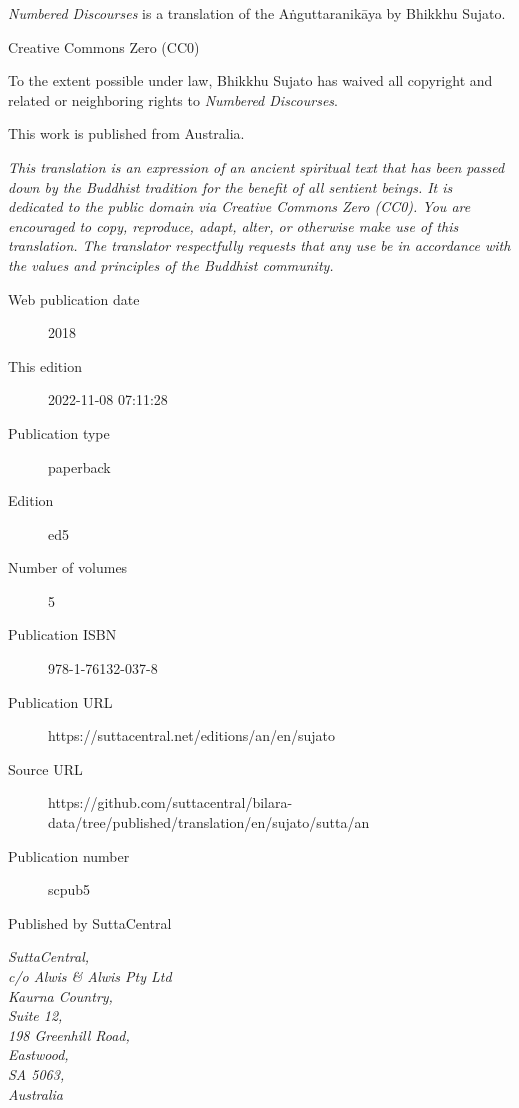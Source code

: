 \documentclass[12pt,openany]{book}%
\begin{document}
\begin{footnotesize}

\textit{Numbered Discourses} is a translation of the Aṅguttaranikāya by Bhikkhu Sujato.

\medskip

Creative Commons Zero (CC0)

To the extent possible under law, Bhikkhu Sujato has waived all copyright and related or neighboring rights to \textit{Numbered Discourses}.

\medskip

This work is published from Australia.

\begin{center}
\textit{This translation is an expression of an ancient spiritual text that has been passed down by the Buddhist tradition for the benefit of all sentient beings. It is dedicated to the public domain via Creative Commons Zero (CC0). You are encouraged to copy, reproduce, adapt, alter, or otherwise make use of this translation. The translator respectfully requests that any use be in accordance with the values and principles of the Buddhist community.}
\end{center}

\medskip

\begin{description}
    \item[Web publication date] 2018
    \item[This edition] 2022-11-08 07:11:28
    \item[Publication type] paperback
    \item[Edition] ed5
    \item[Number of volumes] 5
    \item[Publication ISBN] 978-1-76132-037-8
    \item[Publication URL] https://suttacentral.net/editions/an/en/sujato
    \item[Source URL] https://github.com/suttacentral/bilara-data/tree/published/translation/en/sujato/sutta/an
    \item[Publication number] scpub5
\end{description}

\medskip

Published by SuttaCentral

\medskip

\textit{SuttaCentral,\\
c/o Alwis \& Alwis Pty Ltd\\
Kaurna Country,\\
Suite 12,\\
198 Greenhill Road,\\
Eastwood,\\
SA 5063,\\
Australia}

\end{footnotesize}
\end{document}
